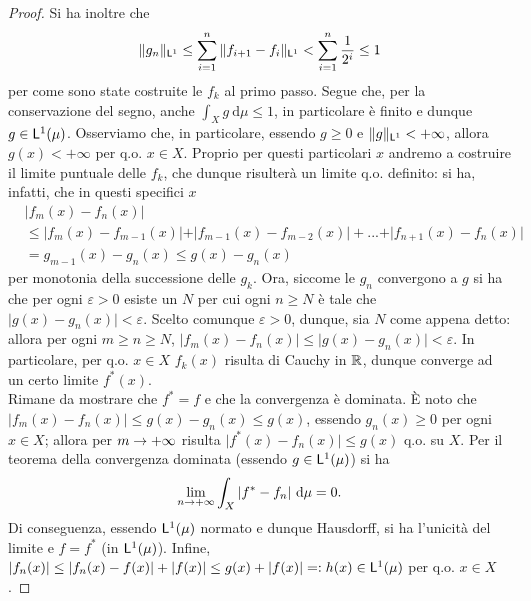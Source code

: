 \documentclass[Completo.tex]{subfiles}
\begin{document}
\begin{proof}
	Si ha inoltre che
	\begin{equation*}
	\Vert g_n \Vert_{\sf[L]^1} \leq \sum_{i = 1}^{n} \Vert f_{i+1} - f_{i} \Vert_{\sf[L]^1} < \sum_{i = 1}^{n} \frac{1}{2^i} \leq 1
	\end{equation*}
	per come sono state costruite le $f_k$ al primo passo. Segue che, per la conservazione del segno, anche $\int_X g \ \mathrm{d}\mu \leq 1$, in particolare è finito e dunque $g \in \sf[L]^1(\mu)$. Osserviamo che, in particolare, essendo $g \geq 0$ e $\Vert g \Vert_{\sf[L]^1} < +\infty$, allora $g(x) < +\infty$ per q.o. $x \in X$. Proprio per questi particolari $x$ andremo a costruire il limite puntuale delle $f_k$, che dunque risulterà un limite q.o. definito: si ha, infatti, che in questi specifici $x$
	\begin{align*}
	& \vert f_m(x) - f_n(x) \vert \\
	& \leq \vert f_m(x) - f_{m-1}(x) \vert + \vert f_{m-1}(x) - f_{m-2}(x) \vert + ... + \vert f_{n+1}(x) - f_{n}(x) \vert \\
	& = g_{m-1}(x) - g_n(x) \leq g(x) - g_n(x)
	\end{align*}
	per monotonia della successione delle $g_k$. Ora, siccome le $g_n$ convergono a $g$ si ha che per ogni $\varepsilon > 0$ esiste un $N$ per cui ogni $n \geq N$ è tale che $\vert g(x) - g_n(x) \vert < \varepsilon$. Scelto comunque $\varepsilon > 0$, dunque, sia $N$ come appena detto: allora per ogni $m \geq n \geq N$, $\vert f_m(x) - f_n(x) \vert \leq \vert g(x) - g_n(x) \vert < \varepsilon$. In particolare, per q.o. $x \in X$ $f_k(x)$ risulta di Cauchy in $\bb[R]$, dunque converge ad un certo limite $f^{*}(x)$. \\
	Rimane da mostrare che $f^{*} = f$ e che la convergenza è dominata. È noto che $\vert f_m(x) - f_n(x) \vert \leq g(x) - g_n(x) \leq g(x)$, essendo $g_n(x) \geq 0$ per ogni $x \in X$; allora per $m \rightarrow +\infty$ risulta $\vert f^{*}(x) - f_n(x) \vert \leq g(x)$ q.o. su $X$. Per il teorema della convergenza dominata (essendo $g \in \sf[L]^1(\mu)$) si ha
	\begin{equation*}
	\lim_{n \rightarrow +\infty} \int_X \vert f^{*} - f_n \vert \ \mathrm{d}\mu = 0.
	\end{equation*}
	Di conseguenza, essendo $\sf[L]^1(\mu)$ normato e dunque Hausdorff, si ha l'unicità del limite e $f = f^{*}$ (in $\sf[L]^1(\mu)$). Infine, $\vert f_n(x) \vert \leq \vert f_n(x) - f(x) \vert + \vert f(x) \vert \leq g(x) + \vert f(x) \vert =: h(x) \in \sf[L]^1(\mu)$ per q.o. $x \in X$.
\end{proof}
\end{document}
